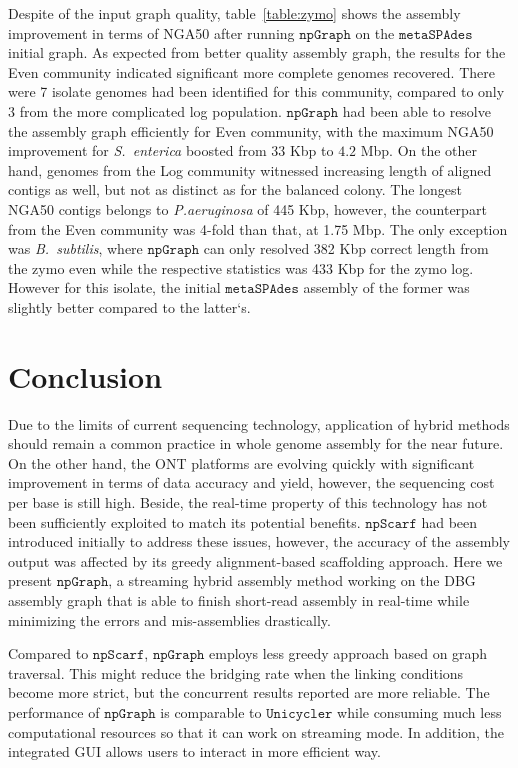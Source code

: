 \documentclass[10pt,twocolumn,twoside]{genpaper}
\newcommand{\npscarf}{$\mathtt{npScarf}$}
\newcommand{\npgraph}{$\mathtt{npGraph}$}
\newcommand{\unicycler}{$\mathtt{Unicycler}$}
\begin{document}
Despite of the input graph quality, table~\ref{table:zymo} shows the assembly improvement in terms of NGA50 after running \npgraph{} on the $\mathtt{metaSPAdes}$ initial graph.  
As expected from better quality assembly graph, the results for the Even community indicated significant more complete genomes recovered. 
There were 7 isolate genomes had been identified for this community, compared to only 3 from the more complicated log population.
\npgraph{} had been able to resolve the assembly graph efficiently for Even community, with the maximum NGA50 improvement for \emph{S.~enterica} boosted from $33$ Kbp to $4.2$ Mbp. 
On the other hand, genomes from the Log community witnessed increasing length of aligned contigs as well, but not as distinct as for the balanced colony. The longest NGA50 contigs belongs to \emph{P.aeruginosa} of 445 Kbp, however, the counterpart from the Even community was 4-fold than that, at 1.75 Mbp.
The only exception was \emph{B.~subtilis}, where \npgraph{} can only resolved 382 Kbp correct length from the zymo even while the respective statistics was 433 Kbp for the zymo log. However for this isolate, the initial $\mathtt{metaSPAdes}$ assembly of the former was slightly better compared to the latter`s.


\section*{Conclusion}
Due to the limits of current sequencing technology, application of hybrid methods should remain a common practice in whole genome assembly for the near future.
On the other hand, the ONT platforms are evolving quickly with significant improvement in terms of data accuracy and yield, however, the sequencing cost per base is still high. Beside, the real-time property of this technology has not been sufficiently exploited to match its potential benefits.
\npscarf{} had been introduced initially to address these issues, however, the accuracy of the assembly output was affected by its greedy alignment-based scaffolding approach.
Here we present \npgraph{}, a streaming hybrid assembly method working on the DBG assembly graph that is able to finish short-read assembly in real-time while minimizing the errors and mis-assemblies drastically.

Compared to \npscarf, \npgraph{} employs less greedy approach based on graph traversal. This might reduce the bridging rate when the linking conditions become more strict, but the concurrent results reported are more reliable.
The performance of \npgraph{} is comparable to \unicycler{} while consuming much less computational resources so that it can work on streaming mode. 
In addition, the integrated GUI allows users to interact in more efficient way.
\end{document}
